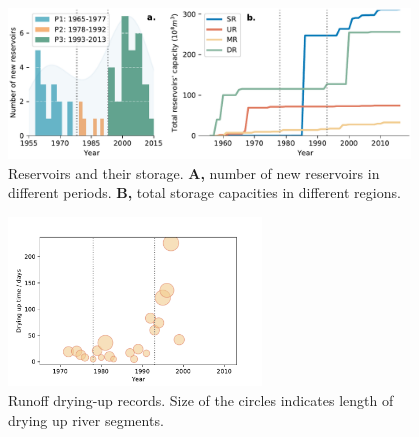 \documentclass[9pt,twoside,lineno]{pnas-new}
\begin{document}
\begin{figure}
    \centering
    \includegraphics[width=0.95\textwidth]{../../figures/sup/reservoirs.pdf}
    \caption{
        Reservoirs and their storage.
        \textbf{A,} number of new reservoirs in different periods.
        \textbf{B,} total storage capacities in different regions.
    }
\end{figure}



\begin{figure}
    \centering
    \includegraphics[width=0.6\textwidth]{../../figures/sup/outages.pdf}
    \caption{Runoff drying-up records. Size of the circles indicates length of drying up river segments.}
\end{figure}
\end{document}
